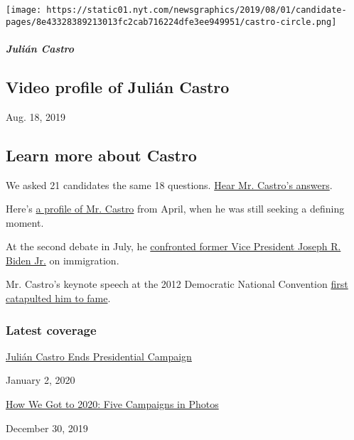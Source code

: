 \texttt{[image: https://static01.nyt.com/newsgraphics/2019/08/01/candidate-pages/8e43328389213013fc2cab716224dfe3ee949951/castro-circle.png]}

\hypertarget{juliuxe1n-castro-1}{%
\subparagraph{Julián Castro}\label{juliuxe1n-castro-1}}

\hypertarget{video-profile-of-juliuxe1n-castro}{%
\subsection{Video profile of Julián
Castro}\label{video-profile-of-juliuxe1n-castro}}

Aug. 18, 2019

\hypertarget{learn-more-about-castro}{%
\subsection{Learn more about Castro}\label{learn-more-about-castro}}

We asked 21 candidates the same 18 questions.
\href{https://www.nytimes.com/interactive/2019/us/politics/julian-castro-2020-campaign.html}{Hear
Mr. Castro's answers}.

Here's
\href{https://www.nytimes.com/2019/04/17/us/politics/julian-castro-2020.html}{a
profile of Mr. Castro} from April, when he was still seeking a defining
moment.

At the second debate in July, he
\href{https://www.nytimes.com/2019/07/31/us/politics/joe-biden-julian-castro-debate.html}{confronted
former Vice President Joseph R. Biden Jr.} on immigration.

Mr. Castro's keynote speech at the 2012 Democratic National Convention
\href{https://www.nytimes.com/2019/08/18/us/politics/julian-castro-2020.html}{first
catapulted him to fame}.

\hypertarget{latest-coverage}{%
\subsubsection{Latest coverage}\label{latest-coverage}}

\href{https://www.nytimes.com/2020/01/02/us/politics/julian-castro-dropping-out.html}{Julián
Castro Ends Presidential Campaign}

January 2, 2020

\href{https://www.nytimes.com/interactive/2019/12/30/us/politics/election-2020-campaign-photos.html}{How
We Got to 2020: Five Campaigns in Photos}

December 30, 2019

